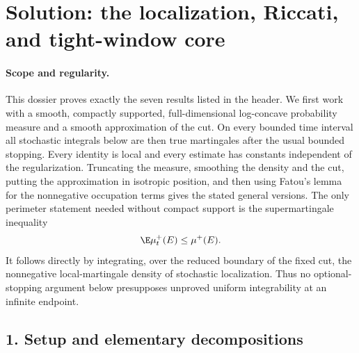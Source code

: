 \documentclass[../main.tex]{subfiles}
\begin{document}
%
\section*{Solution: the localization, Riccati, and tight-window core}
\label{sec:sol-kls-localization-riccati-core}

\paragraph{Scope and regularity.}
This dossier proves exactly the seven results listed in the header.  We first work with a
smooth, compactly supported, full-dimensional log-concave probability measure and a smooth
approximation of the cut.  On every bounded time interval all stochastic integrals below are
then true martingales after the usual bounded stopping.  Every identity is local and every
estimate has constants independent of the regularization.  Truncating the measure, smoothing
the density and the cut, putting the approximation in isotropic position, and then using
Fatou's lemma for the nonnegative occupation terms gives the stated general versions.  The
only perimeter statement needed without compact support is the supermartingale inequality
\begin{equation}\label{eq:sol-perimeter-supermartingale}
  \E\mu_t^+(E)\le \mu^+(E).
\end{equation}
It follows directly by integrating, over the reduced boundary of the fixed cut, the
nonnegative local-martingale density of stochastic localization.  Thus no optional-stopping
argument below presupposes unproved uniform integrability at an infinite endpoint.

\subsection*{1. Setup and elementary decompositions}
\end{document}
